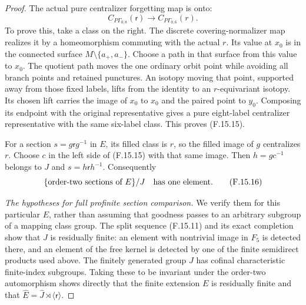 \begin{proof}
The actual pure centralizer forgetting map is onto:
\[
 C_{P\Gamma_{0,8}}(\mathsf r)\longrightarrow
                              C_{P\Gamma_{0,6}}(r).
                                                               \tag{F.15.15}
\]
To prove this, take a class on the right.  The
discrete covering-normalizer map realizes it by a
homeomorphism commuting with the actual $r$.
Its value at $x_0$ is in the connected surface
$M\setminus\{a_+,a_-\}$.  Choose a path in that
surface from this value to $x_0$.  The quotient
path moves the one ordinary orbit point while
avoiding all branch points and retained punctures.
An isotopy moving that point, supported away from
those fixed labels, lifts from the identity to an
$r$-equivariant isotopy.  Its chosen lift carries
the image of $x_0$ to $x_0$ and the paired point to
$y_0$.  Composing its endpoint with the original
representative gives a pure eight-label centralizer
representative with the same six-label class.
This proves (F.15.15).

For a section $s=g\mathsf r g^{-1}$ in $E$, its
filled class is $r$, so the filled image of $g$
centralizes $r$.  Choose $c$ in the left side of
(F.15.15) with that same image.  Then $h=gc^{-1}$
belongs to $J$ and
$s=h\mathsf r h^{-1}$.  Consequently
\[
          \{\hbox{order-two sections of }E\}/J
                            \quad\hbox{has one element}.       \tag{F.15.16}
\]

\emph{The hypotheses for full profinite section comparison.}
We verify them for this particular $E$, rather than
assuming that goodness passes to an arbitrary
subgroup of a mapping class group.
The split sequence (F.15.11) and its exact completion
show that $J$ is residually finite: an element with
nontrivial image in $F_5$ is detected there, and an
element of the free kernel is detected by one of
the finite semidirect products used above.
The finitely generated group $J$ has cofinal
characteristic finite-index subgroups.  Taking
these to be invariant under the order-two
automorphism shows directly that the finite
extension $E$ is residually finite and that
$\widehat E=\widehat J\rtimes\langle\mathsf r\rangle$.


\end{proof}
